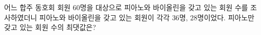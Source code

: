 어느 합주 동호회 회원 $60$명을 대상으로 피아노와 바이올린을 갖고 있는 회원 수를 조사하였더니 피아노와 바이올린을 갖고 있는 회원이 각각 $36$명, $28$명이었다. 피아노만 갖고 있는 회원 수의 최댓값은?
